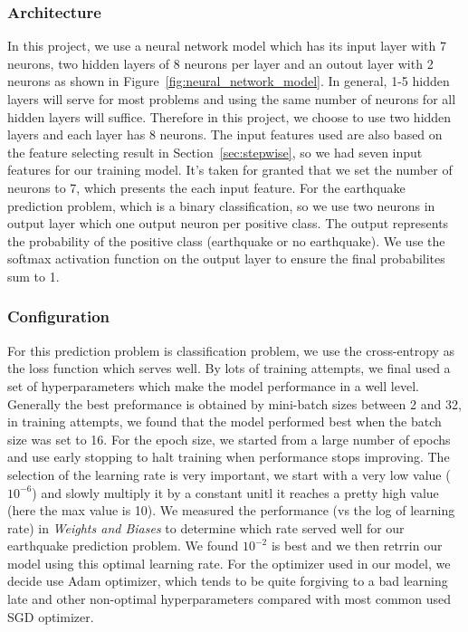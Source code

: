 \documentclass[final-report]{report-template}
\begin{document}
\subsubsection{Architecture}
In this project, we use a neural network model which has its input layer with 7 neurons, two hidden layers of 8 neurons per layer and an outout layer with 2 neurons as shown in Figure~\ref{fig:neural_network_model}. 
In general, 1-5 hidden layers will serve for most problems and using the same number of neurons for all hidden layers will suffice. 
Therefore in this project, we choose to use two hidden layers and each layer has 8 neurons.
The input features used are also based on the feature selecting result in Section~\ref{sec:stepwise}, so we had seven input features for our training model.
It's taken for granted that we set the number of neurons to 7, which presents the each input feature.
For the earthquake prediction problem, which is a binary classification, so we use two neurons in output layer which one output neuron per positive class. The output represents the probability of the positive class (earthquake or no earthquake). We use the softmax activation function on the output layer to ensure the final probabilites sum to 1.


\subsubsection{Configuration}
For this prediction problem is classification problem, we use the cross-entropy \citep{de2005tutorial} as the loss function which serves well.
By lots of training attempts, we final used a set of hyperparameters which make the model performance in a well level.
Generally the best preformance is obtained by mini-batch sizes between 2 and 32, in training attempts, we found that the model performed best when the batch size was set to 16.
For the epoch size, we started from a large number of epochs and use early stopping to halt training when performance stops improving.
The selection of the learning rate is very important, we start with a very low value ($10^{-6}$) and slowly multiply it by a constant unitl it reaches a pretty high value (here the max value is 10).
We measured the performance (vs the log of learning rate) in \textit{Weights and Biases} to determine which rate served well for our earthquake prediction problem. We found $10^{-2}$ is best and we then retrrin our model using this optimal learning rate.
For the optimizer used in our model, we decide use Adam optimizer, which tends to be quite forgiving to a bad learning late and other non-optimal hyperparameters compared with most common used SGD optimizer.
\end{document}
